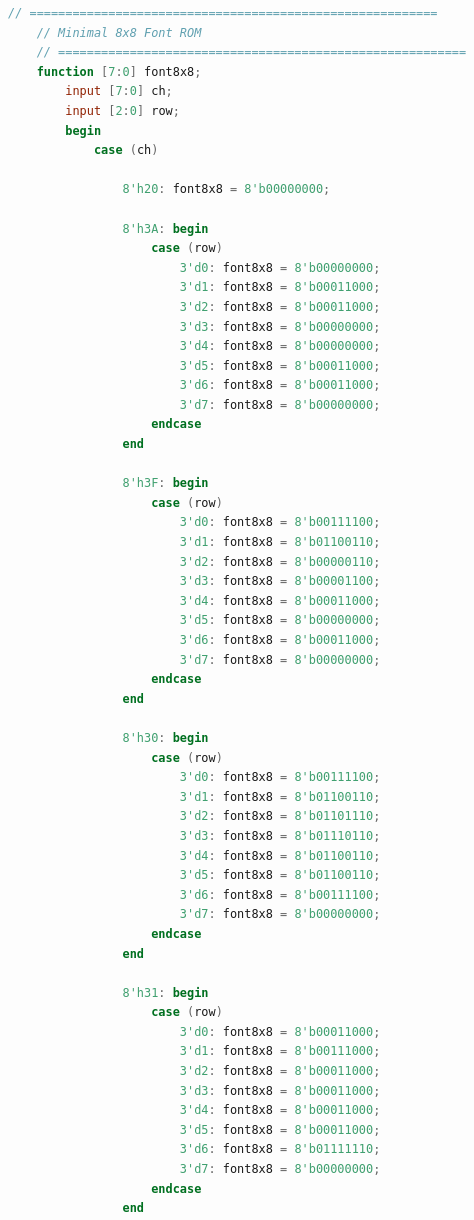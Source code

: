 \begin{lstlisting}[language=Verilog, title={Kode untuk menampilkan data hasil vga ke monitor}, label={code:vga-rgb-565}]
    // =========================================================
    // Minimal 8x8 Font ROM
    // =========================================================
    function [7:0] font8x8;
        input [7:0] ch;
        input [2:0] row;
        begin
            case (ch)

                8'h20: font8x8 = 8'b00000000;

                8'h3A: begin
                    case (row)
                        3'd0: font8x8 = 8'b00000000;
                        3'd1: font8x8 = 8'b00011000;
                        3'd2: font8x8 = 8'b00011000;
                        3'd3: font8x8 = 8'b00000000;
                        3'd4: font8x8 = 8'b00000000;
                        3'd5: font8x8 = 8'b00011000;
                        3'd6: font8x8 = 8'b00011000;
                        3'd7: font8x8 = 8'b00000000;
                    endcase
                end

                8'h3F: begin
                    case (row)
                        3'd0: font8x8 = 8'b00111100;
                        3'd1: font8x8 = 8'b01100110;
                        3'd2: font8x8 = 8'b00000110;
                        3'd3: font8x8 = 8'b00001100;
                        3'd4: font8x8 = 8'b00011000;
                        3'd5: font8x8 = 8'b00000000;
                        3'd6: font8x8 = 8'b00011000;
                        3'd7: font8x8 = 8'b00000000;
                    endcase
                end

                8'h30: begin
                    case (row)
                        3'd0: font8x8 = 8'b00111100;
                        3'd1: font8x8 = 8'b01100110;
                        3'd2: font8x8 = 8'b01101110;
                        3'd3: font8x8 = 8'b01110110;
                        3'd4: font8x8 = 8'b01100110;
                        3'd5: font8x8 = 8'b01100110;
                        3'd6: font8x8 = 8'b00111100;
                        3'd7: font8x8 = 8'b00000000;
                    endcase
                end

                8'h31: begin
                    case (row)
                        3'd0: font8x8 = 8'b00011000;
                        3'd1: font8x8 = 8'b00111000;
                        3'd2: font8x8 = 8'b00011000;
                        3'd3: font8x8 = 8'b00011000;
                        3'd4: font8x8 = 8'b00011000;
                        3'd5: font8x8 = 8'b00011000;
                        3'd6: font8x8 = 8'b01111110;
                        3'd7: font8x8 = 8'b00000000;
                    endcase
                end


\end{lstlisting}
